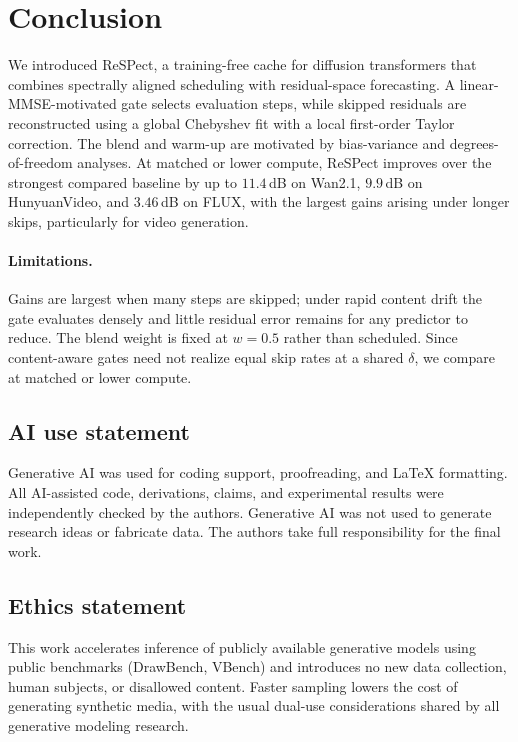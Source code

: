 \documentclass{article} %
\begin{document}
\section{Conclusion}
\label{sec:conclusion}

We introduced ReSPect, a training-free cache for diffusion transformers
that combines spectrally aligned scheduling with residual-space
forecasting. A linear-MMSE-motivated gate selects evaluation steps,
while skipped residuals are reconstructed using a global Chebyshev fit
with a local first-order Taylor correction. The blend and warm-up are
motivated by bias-variance and degrees-of-freedom analyses. At matched
or lower compute, ReSPect improves over the strongest compared baseline
by up to $11.4$\,dB on Wan2.1, $9.9$\,dB on HunyuanVideo, and
$3.46$\,dB on FLUX, with the largest gains arising under longer skips,
particularly for video generation.

\paragraph{Limitations.} Gains are largest when many steps are skipped;
under rapid content drift the gate evaluates densely and little residual
error remains for any predictor to reduce. The blend weight is fixed at
$w{=}0.5$ rather than scheduled. Since content-aware gates need not
realize equal skip rates at a shared $\delta$, we compare at matched or
lower compute.


\subsection*{AI use statement}
Generative AI was used for coding support, proofreading, and
\LaTeX{} formatting. All AI-assisted code, derivations, claims, and
experimental results were independently checked by the authors.
Generative AI was not used to generate research ideas or fabricate
data. The authors take full responsibility for the final work.

\subsection*{Ethics statement}
This work accelerates inference of publicly available generative models
using public benchmarks (DrawBench, VBench) and introduces no new data
collection, human subjects, or disallowed content. Faster sampling
lowers the cost of generating synthetic media, with the usual dual-use
considerations shared by all generative modeling research.
\end{document}
